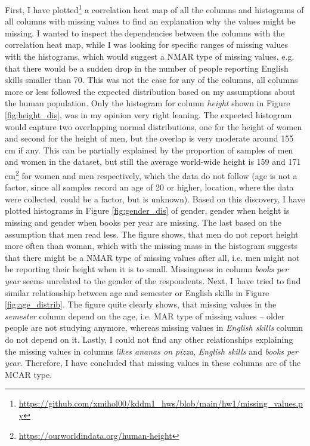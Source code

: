 \documentclass[a4paper,10pt]{article}\setlength{\textheight}{10in}\setlength{\textwidth}{6.5in}\setlength{\topmargin}{-0.125in}\setlength{\oddsidemargin}{-.2in}\setlength{\evensidemargin}{-.2in}\setlength{\headsep}{0.2in}\setlength{\footskip}{0pt}\usepackage{amsmath}\usepackage{fancyhdr}\usepackage{enumitem}\usepackage{hyperref}\usepackage{xcolor}\usepackage{graphicx}\pagestyle{fancy}
\begin{document}
\begin{enumerate}[topsep=0mm, partopsep=0mm, leftmargin=*]
First, I have plotted\footnote{\url{https://github.com/xmihol00/kddm1_hws/blob/main/hw1/missing_values.py}} a correlation heat map of all the columns and histograms of all columns with missing values to find an explanation why the values might be missing. I wanted to inspect the dependencies between the columns with the correlation heat map, while  I was looking for specific ranges of missing values with the histograms, which would suggest a NMAR type of missing values, e.g. that there would be a sudden drop in the number of people reporting English skills smaller than 70. This was not the case for any of the columns, all columns more or less followed the expected distribution based on my assumptions about the human population. Only the histogram for column \textit{height} shown in Figure \ref{fig:height_dis}, was in my opinion very right leaning. The expected histogram would capture two overlapping normal distributions, one for the height of women and second for the height of men, but the overlap is very moderate around 155 cm if any. This can be partially explained by the proportion of samples of men and women in the dataset, but still the average world-wide height is 159 and 171 cm\footnote{\url{https://ourworldindata.org/human-height}} for women and men respectively, which the data do not follow (age is not a factor, since all samples record an age of 20 or higher, location, where the data were collected, could be a factor, but is unknown). Based on this discovery, I have plotted histograms in Figure \ref{fig:gender_dis} of gender, gender when height is missing and gender when books per year are missing. The last based on the assumption that men read less. The figure shows, that men do not report height more often than woman, which with the missing mass in the histogram suggests that there might be a NMAR type of missing values after all, i.e. men might not be reporting their height when it is to small. Missingness in column \textit{books per year} seems unrelated to the gender of the respondents. Next, I~have tried to find similar relationship between age and semester or English skills in Figure \ref{fig:age_distrib}. The figure quite clearly shows, that missing values in the \textit{semester} column depend on the age, i.e. MAR type of missing values -- older people are not studying anymore, whereas missing values in \textit{English skills} column do not depend on it. Lastly, I could not find any other relationships explaining the missing values in columns \textit{likes ananas on pizza}, \textit{English skills} and \textit{books per year}. Therefore, I have concluded that missing values in these columns are of the MCAR type. 


\end{enumerate}
\end{document}
